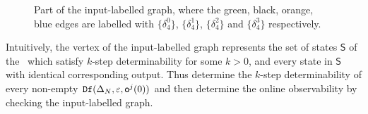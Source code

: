 \begin{figure}[thpb]
      \centering
      
      \caption{Part of the input-labelled graph, where the green, black, orange, blue edges are labelled with $\{\delta_4^0\}$, $\{\delta_4^1\}$, $\{\delta_4^2\}$ and $\{\delta_4^3\}$ respectively.}
      \label{fig:4}
\end{figure}

Intuitively, the vertex of the input-labelled graph represents the set of states $\mathsf{S}$ of the \BCN\ which satisfy $k$-step determinability for some $k>0$, and every state in $\mathsf{S}$ with identical corresponding output. Thus determine the $k$-step determinability of every non-empty ${\tt Df}(\Delta_N,\varepsilon, \mathsf{o}^{j}(0))$ and then determine the online observability by checking the input-labelled graph.

